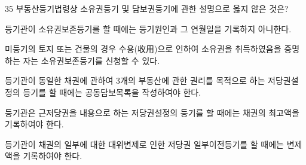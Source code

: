 \begin{question}{35}
부동산등기법령상 소유권등기 및 담보권등기에 관한 설명으로 옳지 않은 것은?
\begin{choices}
  \item 등기관이 소유권보존등기를 할 때에는 등기원인과 그 연월일을 기록하지 아니한다.
  \item 미등기의 토지 또는 건물의 경우 수용(收用)으로 인하여 소유권을 취득하였음을 증명하는 자는 소유권보존등기를 신청할 수 있다.
  \item 등기관이 동일한 채권에 관하여 3개의 부동산에 관한 권리를 목적으로 하는 저당권설정의 등기를 할 때에는 공동담보목록을 작성하여야 한다.
  \item 등기관은 근저당권을 내용으로 하는 저당권설정의 등기를 할 때에는 채권의 최고액을 기록하여야 한다.
  \item 등기관이 채권의 일부에 대한 대위변제로 인한 저당권 일부이전등기를 할 때에는 변제액을 기록하여야 한다.
\end{choices}
\end{question}
